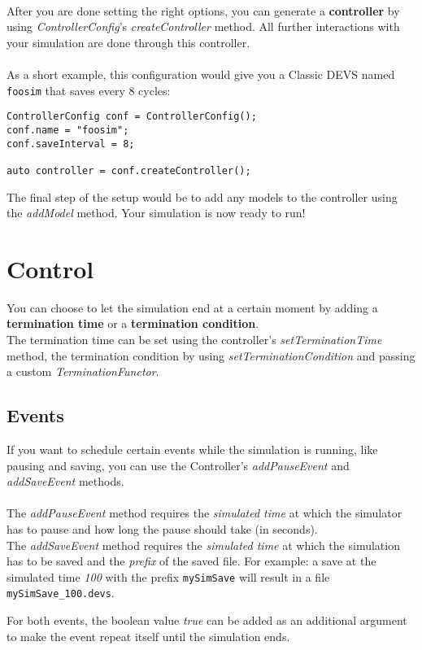 \\
After you are done setting the right options, you can generate a \textbf{controller} by using \textsl{ControllerConfig}'s \textsl{createController} method. All further interactions with your simulation are done through this controller.\\
\\
As a short example, this configuration would give you a Classic DEVS named \texttt{foosim} that saves every 8 cycles:
\begin{verbatim}
ControllerConfig conf = ControllerConfig();
conf.name = "foosim";
conf.saveInterval = 8;

auto controller = conf.createController();
\end{verbatim}
The final step of the setup would be to add any models to the controller using the \textsl{addModel} method. Your simulation is now ready to run!

\section{Control}
You can choose to let the simulation end at a certain moment by adding a \textbf{termination time} or a \textbf{termination condition}.\\
The termination time can be set using the controller's \textsl{setTerminationTime} method, the termination condition by using \textsl{setTerminationCondition} and passing a custom \textsl{TerminationFunctor}.

\subsection{Events}
If you want to schedule certain events while the simulation is running, like pausing and saving, you can use the Controller's \textsl{addPauseEvent} and \textsl{addSaveEvent} methods.\\
\\
The \textsl{addPauseEvent} method requires the \emph{simulated time} at which the simulator has to pause and how long the pause should take (in seconds).\\
The \textsl{addSaveEvent} method requires the \emph{simulated time} at which the simulation has to be saved and the \textsl{prefix} of the saved file. For example: a save at the simulated time \textit{100} with the prefix \texttt{mySimSave} will result in a file \texttt{mySimSave\_100.devs}.

For both events, the boolean value \textit{true} can be added as an additional argument to make the event repeat itself until the simulation ends.

